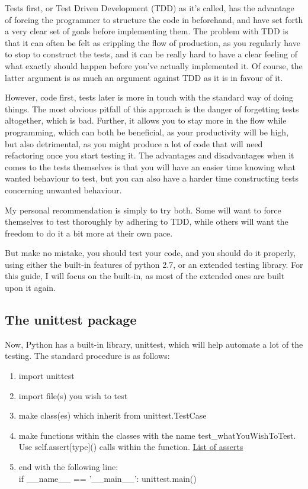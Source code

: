 \documentclass[10pt,a4paper]{article}
\begin{document}
Tests first, or Test Driven Development (TDD) as it's called, has the advantage of forcing the programmer to structure the code in beforehand, and have set forth a very clear set of goals before implementing them. The problem with TDD is that it can often be felt as crippling the flow of production, as you regularly have to stop to construct the tests, and it can be really hard to have a clear feeling of what exactly should happen before you've actually implemented it. Of course, the latter argument is as much an argument against TDD as it is in favour of it.

However, code first, tests later is more in touch with the standard way of doing things. The most obvious pitfall of this approach is the danger of forgetting tests altogether, which is bad. Further, it allows you to stay more in the flow while programming, which can both be beneficial, as your productivity will be high, but also detrimental, as you might produce a lot of code that will need refactoring once you start testing it. The advantages and disadvantages when it comes to the tests themselves is that you will have an easier time knowing what wanted behaviour to test, but you can also have a harder time constructing tests concerning unwanted behaviour. 

My personal recommendation is simply to try both. Some will want to force themselves to test thoroughly by adhering to TDD, while others will want the freedom to do it a bit more at their own pace.

But make no mistake, you should test your code, and you should do it properly, using either the built-in features of python 2.7, or an extended testing library. For this guide, I will focus on the built-in, as most of the extended ones are built upon it again. 

\subsection{The unittest package}

Now, Python has a built-in library, unittest, which will help automate a lot of the testing. The standard procedure is as follows:
\begin{enumerate}
\item import unittest
\item import file(s) you wish to test
\item make class(es) which inherit from unittest.TestCase
\item make functions within the classes with the name test\_whatYouWishToTest. Use self.assert[type]() calls within the function. \href{https://docs.python.org/2/library/unittest.html\#unittest.TestCase.debug}{List of asserts}
\item end with the following line: \\
 if \_\_name\_\_ == '\_\_main\_\_': unittest.main()
\end{enumerate}
\end{document}
